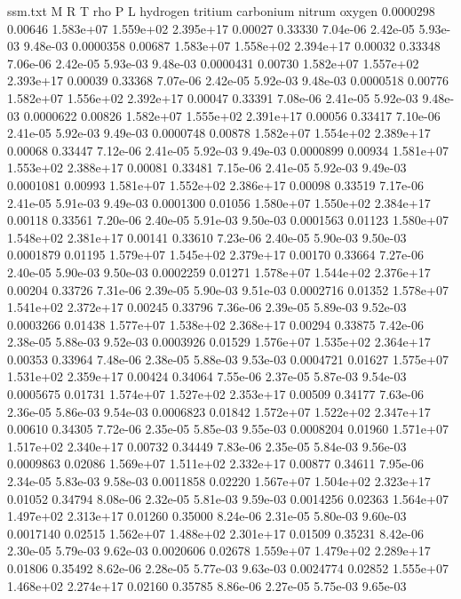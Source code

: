 \begin{filecontents}{ssm.txt}
M R T rho P L hydrogen tritium carbonium nitrum oxygen
0.0000298 0.00646 1.583e+07 1.559e+02 2.395e+17 0.00027 0.33330 7.04e-06 2.42e-05 5.93e-03 9.48e-03
0.0000358 0.00687 1.583e+07 1.558e+02 2.394e+17 0.00032 0.33348 7.06e-06 2.42e-05 5.93e-03 9.48e-03
0.0000431 0.00730 1.582e+07 1.557e+02 2.393e+17 0.00039 0.33368 7.07e-06 2.42e-05 5.92e-03 9.48e-03
0.0000518 0.00776 1.582e+07 1.556e+02 2.392e+17 0.00047 0.33391 7.08e-06 2.41e-05 5.92e-03 9.48e-03
0.0000622 0.00826 1.582e+07 1.555e+02 2.391e+17 0.00056 0.33417 7.10e-06 2.41e-05 5.92e-03 9.49e-03
0.0000748 0.00878 1.582e+07 1.554e+02 2.389e+17 0.00068 0.33447 7.12e-06 2.41e-05 5.92e-03 9.49e-03
0.0000899 0.00934 1.581e+07 1.553e+02 2.388e+17 0.00081 0.33481 7.15e-06 2.41e-05 5.92e-03 9.49e-03
0.0001081 0.00993 1.581e+07 1.552e+02 2.386e+17 0.00098 0.33519 7.17e-06 2.41e-05 5.91e-03 9.49e-03
0.0001300 0.01056 1.580e+07 1.550e+02 2.384e+17 0.00118 0.33561 7.20e-06 2.40e-05 5.91e-03 9.50e-03
0.0001563 0.01123 1.580e+07 1.548e+02 2.381e+17 0.00141 0.33610 7.23e-06 2.40e-05 5.90e-03 9.50e-03
0.0001879 0.01195 1.579e+07 1.545e+02 2.379e+17 0.00170 0.33664 7.27e-06 2.40e-05 5.90e-03 9.50e-03
0.0002259 0.01271 1.578e+07 1.544e+02 2.376e+17 0.00204 0.33726 7.31e-06 2.39e-05 5.90e-03 9.51e-03
0.0002716 0.01352 1.578e+07 1.541e+02 2.372e+17 0.00245 0.33796 7.36e-06 2.39e-05 5.89e-03 9.52e-03
0.0003266 0.01438 1.577e+07 1.538e+02 2.368e+17 0.00294 0.33875 7.42e-06 2.38e-05 5.88e-03 9.52e-03
0.0003926 0.01529 1.576e+07 1.535e+02 2.364e+17 0.00353 0.33964 7.48e-06 2.38e-05 5.88e-03 9.53e-03
0.0004721 0.01627 1.575e+07 1.531e+02 2.359e+17 0.00424 0.34064 7.55e-06 2.37e-05 5.87e-03 9.54e-03
0.0005675 0.01731 1.574e+07 1.527e+02 2.353e+17 0.00509 0.34177 7.63e-06 2.36e-05 5.86e-03 9.54e-03
0.0006823 0.01842 1.572e+07 1.522e+02 2.347e+17 0.00610 0.34305 7.72e-06 2.35e-05 5.85e-03 9.55e-03
0.0008204 0.01960 1.571e+07 1.517e+02 2.340e+17 0.00732 0.34449 7.83e-06 2.35e-05 5.84e-03 9.56e-03
0.0009863 0.02086 1.569e+07 1.511e+02 2.332e+17 0.00877 0.34611 7.95e-06 2.34e-05 5.83e-03 9.58e-03
0.0011858 0.02220 1.567e+07 1.504e+02 2.323e+17 0.01052 0.34794 8.08e-06 2.32e-05 5.81e-03 9.59e-03
0.0014256 0.02363 1.564e+07 1.497e+02 2.313e+17 0.01260 0.35000 8.24e-06 2.31e-05 5.80e-03 9.60e-03
0.0017140 0.02515 1.562e+07 1.488e+02 2.301e+17 0.01509 0.35231 8.42e-06 2.30e-05 5.79e-03 9.62e-03
0.0020606 0.02678 1.559e+07 1.479e+02 2.289e+17 0.01806 0.35492 8.62e-06 2.28e-05 5.77e-03 9.63e-03
0.0024774 0.02852 1.555e+07 1.468e+02 2.274e+17 0.02160 0.35785 8.86e-06 2.27e-05 5.75e-03 9.65e-03

\end{filecontents}
